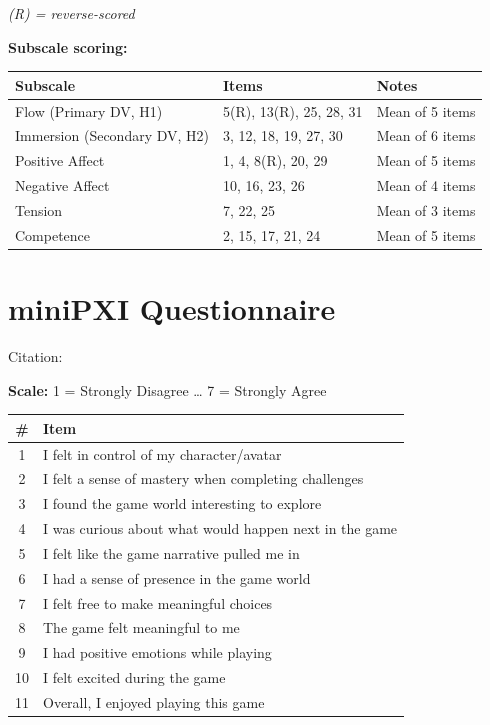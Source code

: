 \documentclass[12pt,a4paper]{report}
\begin{document}
\textit{(R) = reverse-scored}

\vspace{0.5cm}
\textbf{Subscale scoring:}

\begin{table}[H]
\centering
\small
\begin{tabular}{@{}lll@{}}
\toprule
\textbf{Subscale} & \textbf{Items} & \textbf{Notes} \\
\midrule
Flow (Primary DV, H1) & 5(R), 13(R), 25, 28, 31 & Mean of 5 items \\
Immersion (Secondary DV, H2) & 3, 12, 18, 19, 27, 30 & Mean of 6 items \\
Positive Affect & 1, 4, 8(R), 20, 29 & Mean of 5 items \\
Negative Affect & 10, 16, 23, 26 & Mean of 4 items \\
Tension & 7, 22, 25 & Mean of 3 items \\
Competence & 2, 15, 17, 21, 24 & Mean of 5 items \\
\bottomrule
\end{tabular}
\end{table}


\chapter{miniPXI Questionnaire}
\label{app:minipxi}

Citation: \citet{vornhagen2022minipxi}

\textbf{Scale:} 1 = Strongly Disagree \ldots{} 7 = Strongly Agree

\begin{longtable}{@{}cl@{}}
\toprule
\textbf{\#} & \textbf{Item} \\
\midrule
\endfirsthead
1 & I felt in control of my character/avatar \\
2 & I felt a sense of mastery when completing challenges \\
3 & I found the game world interesting to explore \\
4 & I was curious about what would happen next in the game \\
5 & I felt like the game narrative pulled me in \\
6 & I had a sense of presence in the game world \\
7 & I felt free to make meaningful choices \\
8 & The game felt meaningful to me \\
9 & I had positive emotions while playing \\
10 & I felt excited during the game \\
11 & Overall, I enjoyed playing this game \\
\bottomrule
\end{longtable}
\end{document}
